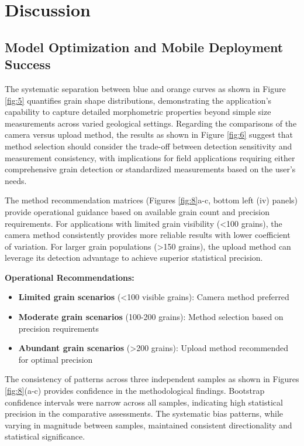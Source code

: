 \documentclass[final-report]{report-template}
\begin{document}
\section{Discussion}
\subsection{Model Optimization and Mobile Deployment Success}
The systematic separation between blue and orange curves as shown in Figure \ref{fig:5} quantifies grain shape distributions, demonstrating the application's capability to capture detailed morphometric properties beyond simple size measurements across varied geological settings. Regarding the comparisons of the camera versus upload method, the results as shown in Figure \ref{fig:6} suggest that method selection should consider the trade-off between detection sensitivity and measurement consistency, with implications for field applications requiring either comprehensive grain detection or standardized measurements based on the user's needs. 

The method recommendation matrices (Figures \ref{fig:8}a-c, bottom left (iv) panels) provide operational guidance based on available grain count and precision requirements. For applications with limited grain visibility (\textless 100 grains), the camera method consistently provides more reliable results with lower coefficient of variation. For larger grain populations (\textgreater 150 grains), the upload method can leverage its detection advantage to achieve superior statistical precision.

\textbf{Operational Recommendations:}

\begin{itemize}
    \item \textbf{Limited grain scenarios} (\textless 100 visible grains): Camera method preferred
\end{itemize}
\begin{itemize}
    \item \textbf{Moderate grain scenarios} (100-200 grains): Method selection based on precision requirements
\end{itemize}
\begin{itemize}
    \item \textbf{Abundant grain scenarios} (\textgreater 200 grains): Upload method recommended for optimal precision
\end{itemize}

The consistency of patterns across three independent samples as shown in Figures \ref{fig:8}(a-c) provides confidence in the methodological findings. Bootstrap confidence intervals were narrow across all samples, indicating high statistical precision in the comparative assessments. The systematic bias patterns, while varying in magnitude between samples, maintained consistent directionality and statistical significance.
\end{document}
